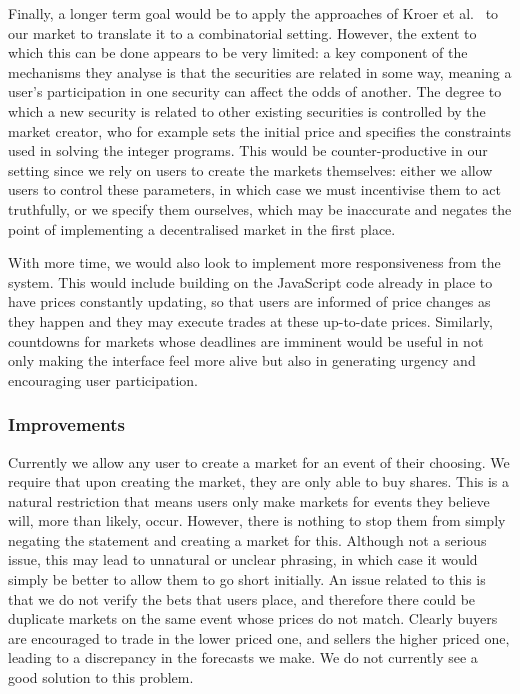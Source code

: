 Finally, a longer term goal would be to apply the approaches of Kroer et
al.~\cite{Kroer2016} to our market to translate it to a combinatorial setting.
However, the extent to which this can be done appears to be very limited: a key
component of the mechanisms they analyse is that the securities are related in
some way, meaning a user's participation in one security can affect the odds of
another. The degree to which a new security is related to other existing
securities is controlled by the market creator, who for example sets the
initial price and specifies the constraints used in solving the integer
programs. This would be counter-productive in our setting since we rely on
users to create the markets themselves: either we allow users to control these
parameters, in which case we must incentivise them to act truthfully, or we
specify them ourselves, which may be inaccurate and negates the point of
implementing a decentralised market in the first place.

With more time, we would also look to implement more responsiveness from the 
system. This would include building on the JavaScript code already in place to
have prices constantly updating, so that users are informed of price changes as
they happen and they may execute trades at these up-to-date prices. Similarly,
countdowns for markets whose deadlines are imminent would be useful in not only
making the interface feel more alive but also in generating urgency and
encouraging user participation.

\subsubsection{Improvements}

Currently we allow any user to create a market for an event of their choosing.
We require that upon creating the market, they are only able to buy
shares. This is a natural restriction that means users only make markets for
events they believe will, more than likely, occur. However, there is nothing to
stop them from simply negating the statement and creating a market for this.
Although not a serious issue, this may lead to unnatural or unclear phrasing,
in which case it would simply be better to allow them to go short initially.
An issue related to this is that we do not verify the bets that users place,
and therefore there could be duplicate markets on the same event whose prices
do not match. Clearly buyers are encouraged to trade in the lower priced one,
and sellers the higher priced one, leading to a discrepancy in the forecasts we
make. We do not currently see a good solution to this problem.


